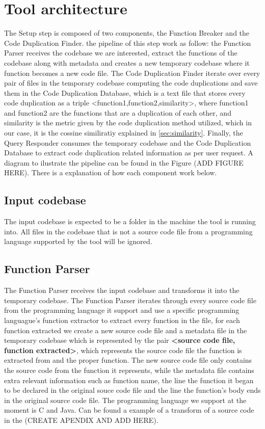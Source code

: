 \en

\section{Tool architecture}
\label{subsec:architecture}

The Setup step is composed of two components, the Function Breaker and the Code Duplication Finder. the pipeline of this step work as
follow: the Function Parser receives the codebase we are interested, extract the functions of the codebase along with metadata and
creates a new temporary codebase where it function becomes a new code file. The Code Duplication Finder iterate over every pair of 
files in the temporary codebase computing the code duplications and save them in the Code Duplication Database, which is a text file
that stores every code duplication as a triple <function1,function2,similarity>, where function1 and function2 are the functions that 
are a duplication of each other, and similarity is the metric given by the code duplication method utilized, which in our case, it is
the cossine similiratiy explained in \ref{sec:similarity}. Finally, the Query Responder consumes the temporary codebase and the 
Code Duplication Database to extract code duplication related information as per user request. A diagram to ilustrate the pipeline
can be found in the Figure (ADD FIGURE HERE). There is a explanation of how each component work below.

\subsection{Input codebase}

The input codebase is expected to be a folder in the machine the tool is running into. All files in the codebase that is not a source
code file from a programming language supported by the tool will be ignored.

\subsection{Function Parser}

The Function Parser receives the input codebase and transforms it into the temporary codebase. The Function Parser iterates through
every source code file from the programming language it support and use a specific programming languague's function 
extractor to extract
every function in the file, for each function extracted we create a new source code file and a metadata file in the temporary codebase
which is represented by the pair \textbf{<source code file, function extracted>}, which represents the source code file the 
function is extracted from and the 
proper function. The new source code file only contains the source code from the function it represents, while the metadata file 
contains extra relevant information such as function name, the line the function it began to be declared in the original souce code 
file and the line the function's body ends in the original source code file. The programming language we support at the moment 
is C and Java. Can be found a example of a transform of a source code in the (CREATE APENDIX AND ADD HERE).

